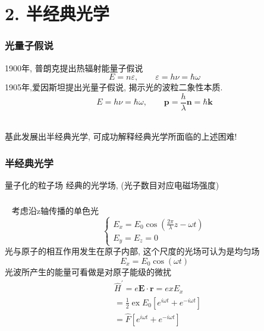\section{2. 半经典光学}

\begin{frame}
      \frametitle{光量子假说}
      1900年, 普朗克提出热辐射能量子假说
      \[E= n \varepsilon , \qquad \varepsilon= h \nu= \hbar \omega\]
      1905年,爱因斯坦提出光量子假说, 揭示光的波粒二象性本质.  \\ {\vspace*{1em}}
      \[E= h \nu= \hbar \omega, \qquad  \mathbf{p}=\frac{h}{\lambda} \mathbf{n} = \hbar \mathbf{k} \]  
      \\  \vspace*{3em}

      基此发展出半经典光学, 可成功解释经典光学所面临的上述困难!
\end{frame}

\begin{frame}
    \frametitle{半经典光学}     
    \begin{itemize}
        \Item 量子化的粒子场
        \Item 经典的光学场, (光子数目对应电磁场强度)
    \end{itemize}  
\end{frame}

\begin{frame}
      \frametitle{}
      \例 [2. 试采用半经典方法处理光与原子的相互作用问题] {}
      \解~ 考虑沿z轴传播的单色光 
      \[ \left\{\begin{array}{l}
        E_{x}=E_{0} \cos \left(\frac{2 \pi}{\lambda} z-\omega t\right) \\
        E_{y}=E_{z}=0
        \end{array}\right. \]
     光与原子的相互作用发生在原子内部, 这个尺度的光场可认为是均匀场
     \[E_{x}=E_{0} \cos \left(\omega t\right)  \]
     光波所产生的能量可看做是对原子能级的微扰 
     \[\begin{aligned}
        &\hat{H}^{\prime}=e\mathbf{E}\cdot \mathbf{r} = ex E_{x} \\
        &=\frac{1}{2} \operatorname{ex} E_{0}\left[e^{i \omega t}+e^{-i \omega t}\right] \\
        &=\hat{F}\left[e^{i \omega t}+e^{-i \omega t}\right]
        \end{aligned}
      \]
\end{frame}

